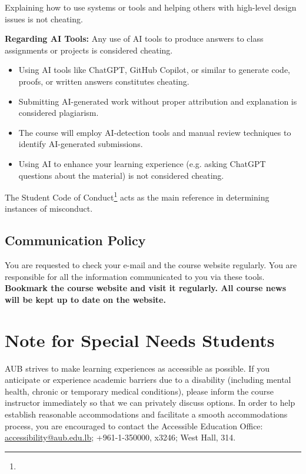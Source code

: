 \documentclass[10pt,a4paper,american]{exam}
\begin{document}
Explaining how to use systems or tools and helping others with high-level design issues is not cheating.

\textbf{Regarding AI Tools:} Any use of AI tools to produce answers to class assignments or projects is considered cheating.
\begin{itemize}
	\item Using AI tools like ChatGPT, GitHub Copilot, or similar to generate code, proofs, or written answers constitutes cheating.
	\item Submitting AI-generated work without proper attribution and explanation is considered plagiarism.
	\item The course will employ AI-detection tools and manual review techniques to identify AI-generated submissions.
	\item Using AI to enhance your learning experience (e.g. asking ChatGPT questions about the material) is not considered cheating.
\end{itemize}

The Student Code of Conduct\footnote{\urlcodeofconduct} acts as the main reference in determining instances of misconduct.

\subsection{Communication Policy}
You are requested to check your e-mail and the course website regularly. You are responsible for all the information communicated to you via these tools. \textbf{Bookmark the course website and visit it regularly. All course news will be kept up to date on the website.}

\section{Note for Special Needs Students}
AUB strives to make learning experiences as accessible as possible. If you anticipate or experience academic barriers due to a disability (including mental health, chronic or temporary medical conditions), please inform the course instructor immediately so that we can privately discuss options. In order to help establish reasonable accommodations and facilitate a smooth accommodations process, you are encouraged to contact the Accessible Education Office: \href{mailto:accessibility@aub.edu.lb}{accessibility@aub.edu.lb}; +961-1-350000, x3246; West Hall, 314.
\end{document}
